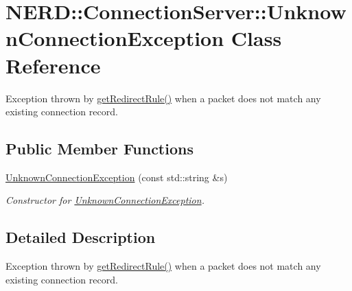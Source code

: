 \hypertarget{classNERD_1_1ConnectionServer_1_1UnknownConnectionException}{
\section{\-N\-E\-R\-D\-:\-:\-Connection\-Server\-:\-:\-Unknown\-Connection\-Exception \-Class \-Reference}
\label{classNERD_1_1ConnectionServer_1_1UnknownConnectionException}
}


\-Exception thrown by \hyperlink{classNERD_1_1ConnectionServer_afd85b7ad69696355650a0177d01f0a06}{get\-Redirect\-Rule()} when a packet does not match any existing connection record.  


\subsection*{\-Public \-Member \-Functions}
\begin{DoxyCompactItemize}
\item 
\hyperlink{classNERD_1_1ConnectionServer_1_1UnknownConnectionException_aa102c5354baed9c1abde486991bd8616}{\-Unknown\-Connection\-Exception} (const std\-::string \&s)
\begin{DoxyCompactList}\small\item\em \-Constructor for \hyperlink{classNERD_1_1ConnectionServer_1_1UnknownConnectionException}{\-Unknown\-Connection\-Exception}. \end{DoxyCompactList}\end{DoxyCompactItemize}


\subsection{\-Detailed \-Description}
\-Exception thrown by \hyperlink{classNERD_1_1ConnectionServer_afd85b7ad69696355650a0177d01f0a06}{get\-Redirect\-Rule()} when a packet does not match any existing connection record. 

